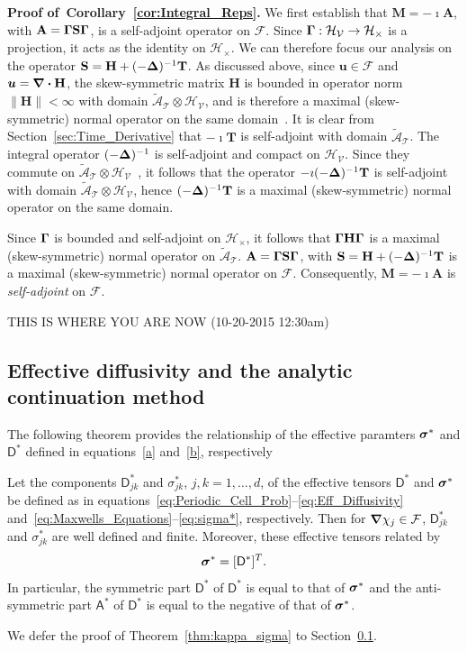 \documentclass[leqno,onefignum,onetabnum]{siamltex1213}
\newcommand{\secref}[1]{Section~\ref{#1}}
\newcommand{\thmref}[1]{Theorem~\ref{#1}}
\newcommand{\corref}[1]{Corollary~\ref{#1}}
\newcommand{\Mb}{\mathbf{M}}
\newcommand{\Tb}{\mathbf{T}}
\newcommand{\Hb}{\mathbf{H}}
\newcommand{\Sb}{\mathbf{S}}
\newcommand{\Ab}{\mathbf{A}}
\newcommand{\Tc}{\mathcal{T}}
\newcommand{\Vc}{\mathcal{V}}
\newcommand{\Hc}{\mathcal{H}}
\newcommand{\Fc}{\mathcal{F}}
\newcommand{\Ac}{\mathcal{A}}
\newcommand{\Dm}{\mathsf{D}}
\newcommand{\Am}{\mathsf{A}}
\newcommand\bsig{\mbox{\boldmath${\sigma}$}}
\newcommand\bDelta{\mbox{\boldmath${\Delta}$}}
\newcommand\bGamma{\mbox{\boldmath${\Gamma}$}}
\newcommand\bnabla{\mbox{\boldmath${\nabla}$}}
\providecommand\bcdot{\boldsymbol{\cdot}}
\newcommand{\vecu}{\boldsymbol{u}}
\begin{document}
\textbf{Proof of~\corref{cor:Integral_Reps}.}\hspace{1ex}
%
We first establish that $\Mb=-\imath \Ab$, with $\Ab=\bGamma\Sb\bGamma$, is
a self-adjoint operator on $\Fc$. Since $\bGamma:\Hc_{\Vc}\to\Hc_\times$ is a
projection, it acts as the identity on $\Hc_\times$. We can therefore focus
our analysis on the operator $\Sb=\Hb+(-\bDelta)^{-1}\Tb$. As
discussed above, since $\vecu\in\Fc$ and $\vecu=\bnabla\bcdot\Hb$, the
skew-symmetric matrix $\Hb$ is bounded in operator norm $\|\Hb\|<\infty$ with
domain $\tilde{\Ac}_{\Tc}\otimes\Hc_{\Vc}$, and is therefore a maximal
(skew-symmetric) normal operator on the same
domain~\cite{Stone:64}. It is clear from \secref{sec:Time_Derivative}
that $-\imath\Tb$ is self-adjoint with domain $\tilde{\Ac}_{\Tc}$. The
integral operator $(-\bDelta)^{-1}$ is self-adjoint and compact on
$\Hc_{\Vc}$. Since they commute on
$\tilde{\Ac}_{\Tc}\otimes\Hc_{\Vc}$~\cite{Folland:99:RealAnalysis}, it
follows that the operator $-\imath(-\bDelta)^{-1}\Tb$ is self-adjoint with
domain $\tilde{\Ac}_{\Tc}\otimes\Hc_{\Vc}$, hence $(-\bDelta)^{-1}\Tb$ is a
maximal (skew-symmetric) normal operator on the same domain.

Since $\bGamma$ is bounded and self-adjoint on $\Hc_\times$, it
follows that $\bGamma\Hb\bGamma$ is a maximal (skew-symmetric) normal
operator on $\tilde{\Ac}_{\Tc}$. 
$\Ab=\bGamma\Sb\bGamma$, with $\Sb=\Hb+(-\bDelta)^{-1}\Tb$ is a 
maximal (skew-symmetric) normal operator on $\Fc$. Consequently,
$\Mb=-\imath\Ab$ is \emph{self-adjoint} on $\Fc$. 




\newpage
THIS IS WHERE YOU ARE NOW (10-20-2015 12:30am)

 

\subsection{Effective diffusivity and the analytic continuation method}
\label{sec:Proof_of_D*=sigma*T}
%
The following theorem provides the relationship of the effective
paramters $\bsig^*$ and $\Dm^*$ defined in equations~\eqref{a}
and~\eqref{b}, respectively 
%
\begin{theorem}\label{thm:kappa_sigma}
%
Let the components $\Dm^*_{jk}$ and $\sigma^*_{jk}$, $j,k=1,\ldots,d$, of the
effective tensors $\Dm^*$ and $\bsig^*$ be defined as in
equations~\eqref{eq:Periodic_Cell_Prob}--\eqref{eq:Eff_Diffusivity}
and~\eqref{eq:Maxwells_Equations}--\eqref{eq:sigma*},
respectively. Then for $\bnabla \chi_j\in\Fc$, $\Dm^*_{jk}$ and $\sigma^*_{jk}$
are well defined and finite. 
Moreover, these effective tensors related by
% 
\begin{align}\label{eq:Eff_Equiv}
  \bsig^*=[\Dm^*]^T.
\end{align}
%
In particular, the symmetric part $\Dm^*$ of $\Dm^*$ is equal to
that of $\bsig^*$ and the anti-symmetric part $\Am^*$ of $\Dm^*$
is equal to the negative of that of $\bsig^*$.
%
\end{theorem}
%
We defer the proof of \thmref{thm:kappa_sigma} to
\secref{sec:Proof_of_D*=sigma*T}. 
\end{document}
